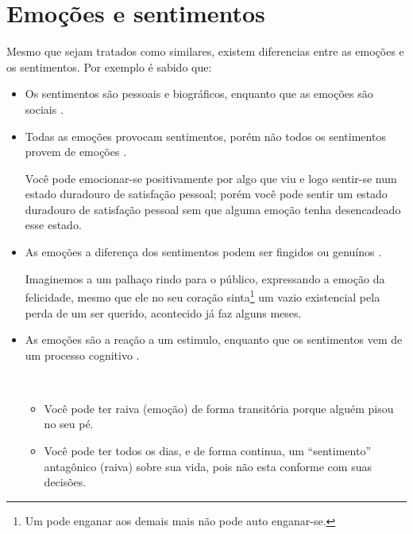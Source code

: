 \newpage

\section{Emoções e sentimentos}
\label{ref:emotionsentimental}
Mesmo que sejam tratados como similares, 
existem diferencias entre as emoções e os sentimentos.
Por exemplo é sabido que:
\begin{itemize}
%
\item Os sentimentos são pessoais e biográficos, enquanto que as emoções são sociais \cite[pp. 42]{hofman2015affective}.
%
\item Todas as emoções provocam sentimentos, porém não todos os sentimentos provem de emoções
\cite[pp. 288]{zanelli2014psicologia} \cite{freitas2015codigo}.
\begin{example}
Você pode emocionar-se positivamente por algo que viu e logo sentir-se num estado duradouro de satisfação pessoal;
porém você pode sentir um estado duradouro de satisfação pessoal sem que alguma emoção tenha desencadeado esse estado.
\end{example}
%
\item As emoções a diferença dos sentimentos podem ser fingidos ou genuínos \cite[pp. 32]{nicolas2018musicas}.
\begin{example}[Ri palhaço\, ri:]
Imaginemos a um palhaço rindo para o público, expressando a emoção da felicidade,
mesmo que ele no seu coração sinta\footnote{Um pode enganar aos demais mais não pode auto enganar-se.} 
um vazio existencial pela perda de um ser querido,
acontecido já faz alguns meses.
\end{example}
\item As emoções são a reação a um estimulo, enquanto que os sentimentos vem de um processo cognitivo \cite{freitas2013psicologia}.
\begin{example} ~

\begin{itemize}
\item Você pode ter raiva (emoção) de forma transitória porque alguém pisou no seu pé.
\item Você pode ter todos os dias, e de forma continua, um ``sentimento'' antagônico (raiva) sobre sua vida, 
pois não esta conforme com suas decisões.
\end{itemize}
\end{example}
\end{itemize}

